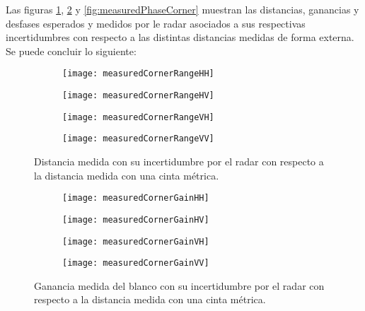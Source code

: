 Las figuras \ref{fig:measuredDistCorner}, \ref{fig:measuredGainCorner} y \ref{fig:measuredPhaseCorner} muestran las distancias, ganancias y desfases esperados y medidos por le radar asociados a sus respectivas incertidumbres con respecto a las distintas distancias medidas de forma externa. Se puede concluir lo siguiente:
\begin{figure}[H]
  \centering
  \begin{subfigure}{0.49\textwidth}
    \texttt{[image: measuredCornerRangeHH]}
  \end{subfigure}
  \begin{subfigure}{0.49\textwidth}
    \texttt{[image: measuredCornerRangeHV]}
  \end{subfigure}

  \begin{subfigure}{0.49\textwidth}
    \texttt{[image: measuredCornerRangeVH]}
  \end{subfigure}
  \begin{subfigure}{0.49\textwidth}
    \texttt{[image: measuredCornerRangeVV]}
  \end{subfigure}
  \caption{Distancia medida con su incertidumbre por el radar con respecto a la distancia medida con una cinta métrica.}
  \label{fig:measuredDistCorner}
\end{figure}
\begin{figure}[H]
  \centering
  \begin{subfigure}{0.49\textwidth}
    \texttt{[image: measuredCornerGainHH]}
  \end{subfigure}
  \begin{subfigure}{0.49\textwidth}
    \texttt{[image: measuredCornerGainHV]}
  \end{subfigure}

  \begin{subfigure}{0.49\textwidth}
    \texttt{[image: measuredCornerGainVH]}
  \end{subfigure}
  \begin{subfigure}{0.49\textwidth}
    \texttt{[image: measuredCornerGainVV]}
  \end{subfigure}
  \caption{Ganancia medida del blanco con su incertidumbre por el radar con respecto a la distancia medida con una cinta métrica.}
  \label{fig:measuredGainCorner}
\end{figure}
